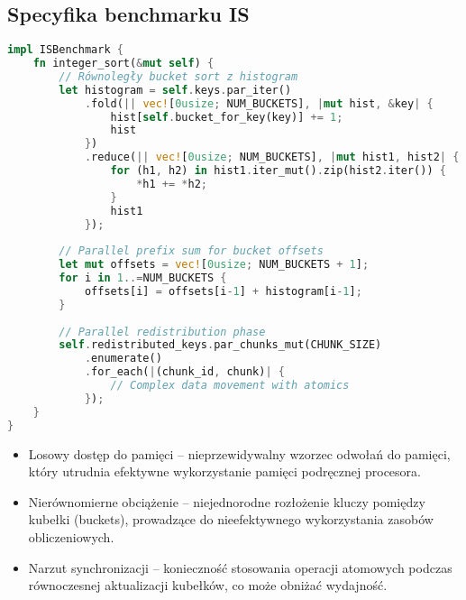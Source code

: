 \subsection{Specyfika benchmarku IS}
\begin{lstlisting}[language=Rust, caption={Implementacja benchmarku IS w języku Rust}, label={lst:is_rust}]
impl ISBenchmark {
    fn integer_sort(&mut self) {
        // Równoległy bucket sort z histogram
        let histogram = self.keys.par_iter()
            .fold(|| vec![0usize; NUM_BUCKETS], |mut hist, &key| {
                hist[self.bucket_for_key(key)] += 1;
                hist
            })
            .reduce(|| vec![0usize; NUM_BUCKETS], |mut hist1, hist2| {
                for (h1, h2) in hist1.iter_mut().zip(hist2.iter()) {
                    *h1 += *h2;
                }
                hist1
            });
        
        // Parallel prefix sum for bucket offsets
        let mut offsets = vec![0usize; NUM_BUCKETS + 1];
        for i in 1..=NUM_BUCKETS {
            offsets[i] = offsets[i-1] + histogram[i-1];
        }
        
        // Parallel redistribution phase
        self.redistributed_keys.par_chunks_mut(CHUNK_SIZE)
            .enumerate()
            .for_each(|(chunk_id, chunk)| {
                // Complex data movement with atomics
            });
    }
}
\end{lstlisting}
\begin{itemize}
    \item Losowy dostęp do pamięci – nieprzewidywalny wzorzec odwołań do pamięci, który utrudnia efektywne wykorzystanie pamięci podręcznej procesora.
    
    \item Nierównomierne obciążenie – niejednorodne rozłożenie kluczy pomiędzy kubełki (buckets), prowadzące do nieefektywnego wykorzystania zasobów obliczeniowych.
    
    \item Narzut synchronizacji – konieczność stosowania operacji atomowych podczas równoczesnej aktualizacji kubełków, co może obniżać wydajność.
  \end{itemize}
  